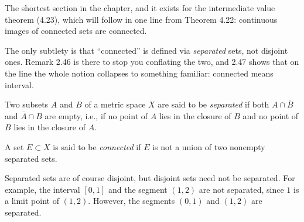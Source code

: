 
\begin{signpost}
The shortest section in the chapter, and it exists for the intermediate value
theorem (4.23), which will follow in one line from Theorem 4.22: continuous
images of connected sets are connected.

\smallskip
The only subtlety is that ``connected'' is defined via \emph{separated} sets,
not disjoint ones. Remark 2.46 is there to stop you conflating the two, and
2.47 shows that on the line the whole notion collapses to something familiar:
connected means interval.
\end{signpost}

Two subsets $A$ and $B$ of a metric space $X$ are said to be \emph{separated}
if both $A \cap \overline{B}$ and $\overline{A} \cap B$ are empty, i.e., if no
point of $A$ lies in the closure of $B$ and no point of $B$ lies in the closure
of $A$.

A set $E \subset X$ is said to be \emph{connected} if $E$ is not a union of two
nonempty separated sets.

Separated sets are of course disjoint, but disjoint sets need not be separated.
For example, the interval $[0,1]$ and the segment $(1,2)$ are not separated,
since $1$ is a limit point of $(1,2)$. However, the segments $(0,1)$ and
$(1,2)$ are separated.

\begin{center}
\end{center}

